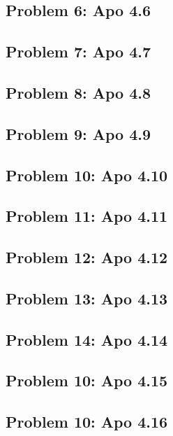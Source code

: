 \subsection[Problem 6]{Problem 6: Apo 4.6}

\subsection[Problem 7]{Problem 7: Apo 4.7}

\subsection[Problem 8]{Problem 8: Apo 4.8}

\subsection[Problem 9]{Problem 9: Apo 4.9}

\subsection[Problem 10]{Problem 10: Apo 4.10}

\subsection[Problem 11]{Problem 11: Apo 4.11}

\subsection[Problem 12]{Problem 12: Apo 4.12}

\subsection[Problem 13]{Problem 13: Apo 4.13}

\subsection[Problem 14]{Problem 14: Apo 4.14}

\subsection[Problem 15]{Problem 10: Apo 4.15}

\subsection[Problem 16]{Problem 10: Apo 4.16}

